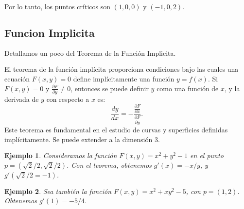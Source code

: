 \documentclass[11pt]{book}
\theoremstyle{definicion}
\theoremstyle{teorema}
\theoremstyle{ejemplo}
\newtheorem{example}{Ejemplo}
\begin{document}
Por lo tanto, los puntos críticos son \( (1, 0, 0) \) y \( (-1, 0, 2) \).



%

\subsection{Funcion Implicita}

\noindent 
Detallamos un poco del Teorema de la Función Implicita.


El teorema de la función implícita proporciona condiciones bajo las cuales una ecuación \( F(x, y) = 0 \) define implícitamente una función \( y = f(x) \). Si \( F(x, y) = 0 \) y \( \frac{\partial F}{\partial y} \neq 0 \), entonces se puede definir \( y \) como una función de \( x \), y la derivada de \( y \) con respecto a \( x \) es:
\[ \frac{dy}{dx} = -\frac{\frac{\partial F}{\partial x}}{\frac{\partial F}{\partial y}}. \]
Este teorema es fundamental en el estudio de curvas y superficies definidas implícitamente. Se puede extender a la dimensión 3.

\begin{example} Consideramos la función 
    $F(x,y)=x^2+y^2-1$ en el punto $p=(\sqrt{2}/2,\sqrt{2}/2)$. Con el teorema, obtenemos $g'(x)=-x/y$, y$g'(\sqrt{2}/2=-1)$.
\end{example}

\begin{example} Sea también la función
 $F(x,y) = x^2 + xy^2 -5$, con $p=(1,2)$. Obtenemos $g'(1)=-5/4$.   
\end{example}
\end{document}
